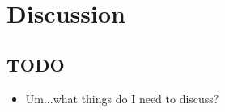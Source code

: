 \chapter{Discussion}\label{ch:discussion}

\section{TODO}

\begin{itemize}
\item Um...what things do I need to discuss?
\end{itemize}

